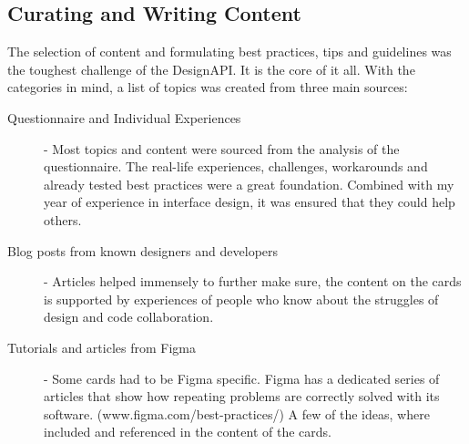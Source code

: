 \newpage
\subsection{Curating and Writing Content}
The selection of content and formulating best practices, tips and guidelines was the toughest
challenge of the DesignAPI. It is the core of it all. With the categories in mind, a list of topics
was created from three main sources:

\begin{description}
    \item[Questionnaire and Individual Experiences] - Most topics and content were sourced from the
          analysis of the questionnaire. The real-life experiences, challenges, workarounds and
          already tested best practices were a great foundation. Combined with my year of experience
          in interface design, it was ensured that they could help others.
    \item[Blog posts from known designers and developers] - Articles helped immensely to further
          make sure, the content on the cards is supported by experiences of people who know about
          the struggles of design and code collaboration.
    \item[Tutorials and articles from Figma] - Some cards had to be Figma specific. Figma has a
          dedicated series of articles that show how repeating problems are correctly solved with its
          software. (www.figma.com/best-practices/) A few of the ideas, where included and referenced in
          the content of the cards.
\end{description}


% 

